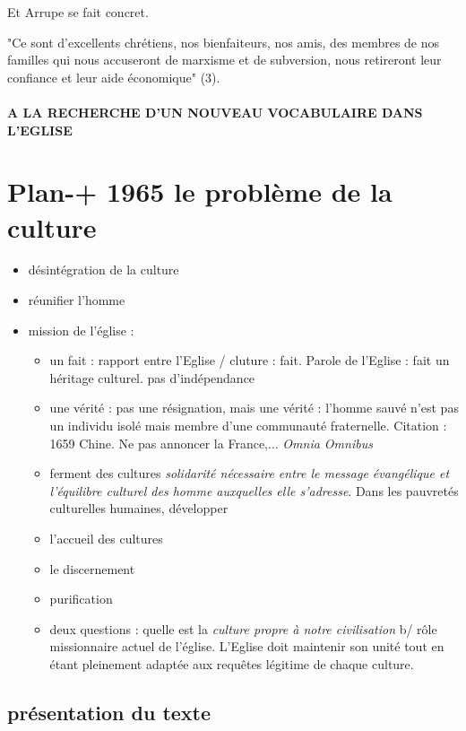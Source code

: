 Et Arrupe se fait concret. 
\begin{singlequote}
"Ce sont d'excellents
chrétiens, nos bienfaiteurs, nos amis, des membres de nos familles qui nous accuseront
de marxisme et de subversion, nous retireront leur confiance et leur aide économique"
(3). 
\end{singlequote}

\paragraph{A LA RECHERCHE D'UN NOUVEAU VOCABULAIRE DANS
L'EGLISE}
\section{Plan-+ 1965 le problème de la culture}
\begin{itemize}
\item désintégration de la culture
\item réunifier l'homme
\item mission de l'église : 
\begin{itemize}
    \item un fait : rapport entre l'Eglise / cluture : fait. Parole de l'Eglise : fait un héritage culturel. pas d'indépendance
    \item une vérité : pas une résignation, mais une vérité : l'homme sauvé n'est pas un individu isolé mais membre d'une communauté fraternelle. 
    Citation : 1659 Chine. Ne pas annoncer la France,...
    \textit{Omnia Omnibus}

    \item ferment des cultures
     \textit{solidarité nécessaire entre le message évangélique et l'équilibre culturel des homme auxquelles elle s'adresse}. Dans les pauvretés culturelles humaines, développer 
     \item l'accueil des cultures
     \item le discernement
     \item purification
     \item deux questions :  quelle est la \textit{culture propre à notre civilisation} b/ rôle missionnaire actuel de l'église.  L'Eglise doit maintenir son unité tout en étant pleinement adaptée aux requêtes légitime de chaque culture.
\end{itemize}
 
\end{itemize}


\subsection{présentation du texte}

